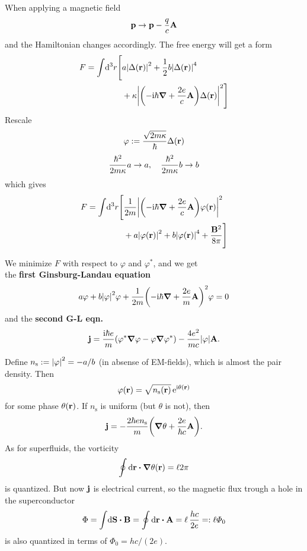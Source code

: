 \documentclass[11pt,letter, swedish, english, twocolumn
]{article}
\newcommand{\ns}{\ensuremath{{n_{\text{s}}}}}
\begin{document}
When applying a magnetic field
\begin{equation}
\vb{p}\to \vb{p}-\frac{q}{c}\vb{A}
\end{equation}
and the Hamiltonian changes accordingly. 
The free energy will get a form
\begin{equation}
\begin{aligned}
F=\int\!\rd^3r\Bigg[&
a\abs{\Delta(\vb{r})}^2+\frac{1}{2}b\abs{\Delta(\vb{r})}^4\\
&+\kappa\abs{\qty(-\ii\hbar\grad+\frac{2e}{c}\vb{A})\Delta(\vb{r})}^2
\Bigg]
\end{aligned}
\end{equation}
Rescale
\begin{equation}
\varphi:=\frac{\sqrt{2m\kappa}}{\hbar}\Delta(\vb{r})
\end{equation}
\begin{equation}
\frac{\hbar^2}{2m\kappa}a\to a \qcomma 
\frac{\hbar^2}{2m\kappa}b \to b
\end{equation}
which gives
\begin{equation}
\begin{aligned}
F=\int\!\rd^3r\Bigg[&
\frac{1}{2m}\abs{\qty(-\ii\hbar\grad+\frac{2e}{c}\vb{A})\varphi(\vb{r})}^2\\
&+a\abs{\varphi(\vb{r})}^2+b\abs{\varphi(\vb{r})}^4+\frac{\vb{B}^2}{8\pi}
\Bigg]
\end{aligned}
\end{equation}

We minimize $F$ with respect to $\varphi$ and $\varphi^*$, and we
get\\ 
the \textbf{first Ginsburg-Landau equation}
\begin{equation}
a\varphi+b\abs{\varphi}^2\varphi
+\frac{1}{2m}\qty(-\mathrm{i}\hbar\grad+\frac{2e}{m}\vb{A})^2\varphi=0
\end{equation}
and the \textbf{second G-L eqn.}
\begin{equation}
\vb{j}=\frac{\mathrm{i}\hbar e}{m}
\qty(\varphi^*\grad\varphi-\varphi\grad\varphi^*)
-\frac{4e^2}{mc}\abs{\varphi}\vb{A}.
\end{equation}

Define $\ns:=\abs{\varphi}^2=-a/b$ (in absense of EM-fields), which is
almost the pair density. Then
\begin{equation}
\varphi(\vb{r})=\sqrt{\ns(\vb{r})}\, \ee^{\ii\theta(\vb{r})}
\end{equation}
for some phase $\theta(\vb{r})$. If $\ns$ is uniform (but $\theta$ is
not), then
\begin{equation}
\vb{j}=-\frac{2\hbar e\ns}{m}\qty(\grad\theta+\frac{2e}{\hbar c}\vb{A}).
\end{equation}
As for superfluids, the vorticity 
\begin{equation}
\oint\rd\vb{r}\vdot\grad\theta(\vb{r})=\ell2\pi
\end{equation}
is quantized. But now $\vb{j}$ is electrical current, so the magnetic
flux trough a hole in the superconductor
\begin{equation}
\Phi=\int\!\rd\vb{S}\vdot\vb{B}=\oint\rd\vb{r}\vdot\vb{A}
=\ell\,\frac{hc}{2e}=:\ell\varPhi_0
\end{equation}
is also quantized in terms of $\varPhi_0=hc/(2e)$.
\end{document}
